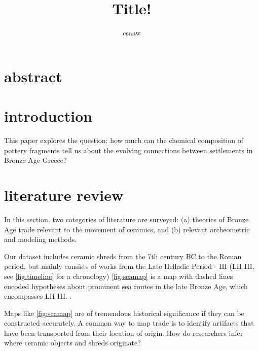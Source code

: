 \documentclass[10pt,a4paper]{article}
\author{csaaw}
\title{Title!}
\begin{document}
\maketitle

\section*{abstract}

\section{introduction}
\label{sec:intro}

This paper explores the question: how much can the chemical composition of pottery fragments tell us about the evolving connections between settlements in Bronze Age Greece? 




\section{literature review}
\label{sec:litrev}

In this section, two categories of literature are surveyed: (a) theories of Bronze Age trade relevant to the movement of ceramics, and (b) relevant archeometric and modeling methods.

Our dataset includes ceramic shreds from the 7th century BC to the Roman period, but mainly consists of works from the Late Helladic Period - III (LH III, see \cref{fig:timeline} for a chronology)
\cref{fig:seamap} is a map with dashed lines encoded hypotheses about prominent sea routes in the late Bronze Age, which encompasses LH III. .  





Maps like \cref{fig:seamap} are of tremendous historical significance if they can be constructed accurately. A common way to map trade is to identify artifacts that have been transported from their location of origin.  How do researchers infer where ceramic objects and shreds originate? 
\end{document}
